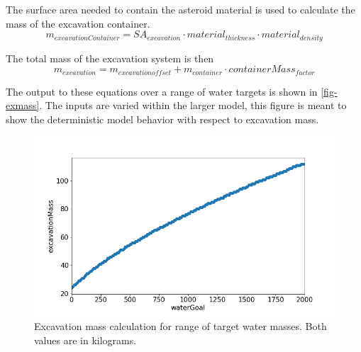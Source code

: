 The surface area needed to contain the asteroid material is used to calculate the mass of the excavation container.
\begin{equation}
    m_{excavationContainer} = SA_{excavation} \cdot material_{thickness} \cdot material_{density}
\end{equation}

The total mass of the excavation system is then 
\begin{equation}
    m_{excavation} = m_{excavation offset} + m_{container} \cdot containerMass_{factor}
\end{equation}

The output to these equations over a range of water targets is shown in \autoref{fig-exmass}. The inputs are varied within the larger model, this figure is meant to show the deterministic model behavior with respect to excavation mass.
\begin{figure}[htb]
    \centering
    \includegraphics[width=0.5\linewidth]{exMass_vs_waterGoal.png}
    \caption{Excavation mass calculation for range of target water masses. Both values are in kilograms.}
    \label{fig-exmass}
\end{figure}
